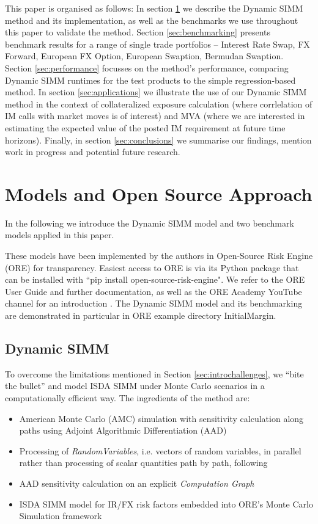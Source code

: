 \documentclass[11pt,a4paper,oneside]{article}
\begin{document}
This paper is organised as follows:
In section \ref{sec:modeloverview} we describe the Dynamic SIMM method and its implementation, as well as the benchmarks we use
throughout this paper to validate the method. Section \ref{sec:benchmarking} presents benchmark results for a range of single
trade portfolios
 -- Interest Rate Swap, FX Forward, European FX Option, European Swaption, Bermudan Swaption. 
Section \ref{sec:performance} focusses on the method's performance, comparing Dynamic SIMM runtimes for the test products to the simple regression-based method.
In section \ref{sec:applications} we illustrate the use of our Dynamic SIMM method in the context of collateralized exposure calculation (where corrlelation of IM calls with market moves is of interest) and MVA (where we are interested in estimating the expected value of the posted IM requirement at future time horizons).
Finally, in section \ref{sec:conclusions} we summarise our findings, mention work in progress and potential future research.

\section{Models and Open Source Approach} \label{sec:modeloverview}

In the following we introduce the Dynamic SIMM model and two benchmark models applied in this paper.

These models have been implemented by the authors in Open-Source Risk Engine (ORE) \cite{ORE} for transparency. 
Easiest access to ORE is via its Python package that can be installed with ``pip install open-source-risk-engine". 
We refer to the ORE User Guide and further documentation, as well as the ORE Academy YouTube channel for an introduction \cite{ORE-2}.
The Dynamic SIMM model and its benchmarking are demonstrated in particular in ORE example directory InitialMargin.

\subsection{Dynamic SIMM}\label{sec:dynamicsimm}

To overcome the limitations mentioned in Section \ref{sec:introchallenges}, we ``bite the bullet'' and 
model ISDA SIMM under Monte Carlo scenarios in a computationally efficient way. 
The ingredients of the method are:
\begin{itemize}
\item American Monte Carlo (AMC) simulation with sensitivity calculation along paths using Adjoint Algorithmic
  Differentiation (AAD)
\item Processing of {\em RandomVariables}, i.e. vectors of random variables, in parallel rather than
  processing of scalar quantities path by path, following \cite{fries_2017-2} 
\item AAD sensitivity calculation on an explicit {\em Computation Graph} 
\item ISDA SIMM model for IR/FX risk factors embedded into ORE's Monte Carlo Simulation framework
\end{itemize}
\end{document}
